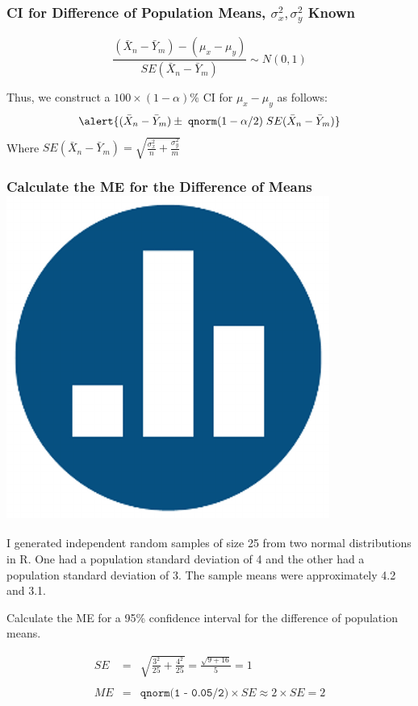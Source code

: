 \begin{frame}
\frametitle{CI for Difference of Population Means, $\sigma_x^2, \sigma_y^2$ Known}
	$$\frac{(\bar{X}_n - \bar{Y}_m) - (\mu_x -\mu_y)}{SE(\bar{X}_n - \bar{Y}_m)} \sim N(0,1)$$
	
	\vspace{1em}

Thus, we construct a $100\times(1-\alpha)\%$ CI for $\mu_x - \mu_y$ as follows:
	$$\alert{(\bar{X}_n - \bar{Y}_m) \pm \; \texttt{qnorm}(1-\alpha/2) \; SE(\bar{X}_n - \bar{Y}_m)}$$
Where $SE(\bar{X}_n - \bar{Y}_m) = \sqrt{\displaystyle\frac{\sigma_x^2}{n} + \frac{\sigma_y^2}{m} }$
\end{frame}
\begin{frame}
\frametitle{Calculate the ME for the Difference of Means \hfill \includegraphics[scale = 0.05]{./images/clicker}}
I generated independent random samples of size 25 from two normal distributions in R. One had a population standard deviation of 4 and the other had a population standard deviation of 3. The sample means were approximately 4.2 and 3.1.

\vspace{1em}
\alert{Calculate the ME for a 95\% confidence interval for the difference of population means.}

\pause
\begin{eqnarray*}
	SE &=& \sqrt{\frac{3^2}{25} + \frac{4^2}{25}} = \frac{\sqrt{9 + 16}}{5} = 1\\  \\
	ME &=& \texttt{qnorm(1 - 0.05/2)} \times SE \approx 2 \times SE = 2
\end{eqnarray*}

\end{frame}
